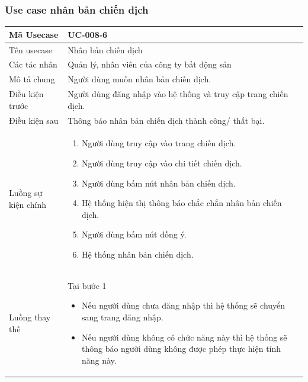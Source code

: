 \documentclass[12pt,a4paper]{article}
\begin{document}
    \subsubsection*{Use case nhân bản chiến dịch}
    \begin{table}[H]
        \centering
        \begin{tabular}{|p{3.5cm}|p{11.5cm}|c|}
            \hline
            Mã Usecase      & UC-008-6                                                        \\
            \hline
            Tên usecase     & Nhân bản chiến dịch                                             \\
            \hline
            Các tác nhân    & Quản lý, nhân viên của công ty bất động sản                     \\
            \hline
            Mô tả chung     & Người dùng muốn nhân bản chiến dịch.                            \\
            \hline

            Điều kiện trước & Người dùng đăng nhập vào hệ thống và truy cập trang chiến dịch. \\
            \hline

            Điều kiện sau   & Thông báo nhân bản chiến dịch thành công/ thất bại.             \\
            \hline

            Luồng sự kiện chính & \vspace{-.8cm}\begin{enumerate}
                                                    \item Người dùng truy cập vào trang chiến dịch.
                                                    \item Người dùng truy cập vào chi tiết chiến dịch.
                                                    \item  Người dùng bấm nút nhân bản chiến dịch.
                                                    \item  Hệ thống hiện thị thông báo chắc chắn nhân bản chiến dịch.
                                                    \item  Người dùng bấm nút đồng ý.
                                                    \item Hệ thống nhân bản chiến dịch.
            \end{enumerate}
            \\
            \hline
            Luồng thay thế & Tại bước 1\newline
            \vspace{-.8cm}\begin{itemize}
                              \item Nếu người dùng chưa đăng nhập thì hệ thống sẽ chuyển sang trang đăng nhập.
                              \item Nếu người dùng không có chức năng này thì hệ thống sẽ thông báo người dùng không được phép thực hiện tính năng này.
            \end{itemize}


\end{tabular}
\end{table}
\end{document}
